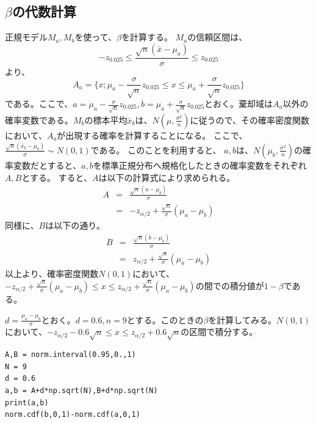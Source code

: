 \subsection{$\beta$の代数計算}
正規モデル$M_a,M_b$を使って、$\beta$を計算する。
$M_a$の信頼区間は、
\begin{equation*}
    -z_{0.025}\leq \frac{\sqrt{n}(\bar{x}-\mu_a)}{\sigma}\leq z_{0.025}
\end{equation*}
より、
\begin{equation*}
    A_a = \{ x ; \mu_a -\frac{\sigma}{\sqrt{n}}z_{0.025} \leq x \leq \mu_a +\frac{\sigma}{\sqrt{n}}z_{0.025} \}
\end{equation*}
である。ここで、$a=\mu_a -\frac{\sigma}{\sqrt{n}}z_{0.025},b = \mu_a +\frac{\sigma}{\sqrt{n}}z_{0.025} $とおく。棄却域は$A_a$以外の確率変数である。$M_b$の標本平均$\bar{x}_b$は、$N(\mu,\frac{\sigma^2}{n})$に従うので、その確率密度関数において、$A_a$が出現する確率を計算することになる。
ここで、$\frac{\sqrt{n}(\bar{x}_b-\mu_b)}{\sigma}\sim N(0,1)$である。
このことを利用すると、
$a,b$は、$N(\mu_b,\frac{\sigma^2}{n})$の確率変数だとすると、$a,b$を標準正規分布へ規格化したときの確率変数をそれぞれ$A,B$とする。
すると、$A$は以下の計算式により求められる。
\begin{eqnarray*}
    A &=& \frac{\sqrt{n}(a-\mu_b)}{\sigma} \\
    &=& -z_{\alpha/2}+\frac{\sqrt{n}}{\sigma}(\mu_a-\mu_b)
\end{eqnarray*}
同様に、$B$は以下の通り。
\begin{eqnarray*}
    B &=& \frac{\sqrt{n}(b-\mu_b)}{\sigma} \\
    &=& z_{\alpha/2}+\frac{\sqrt{n}}{\sigma}(\mu_a-\mu_b)
\end{eqnarray*}
以上より、確率密度関数$N(0,1)$において、$-z_{\alpha/2}+\frac{\sqrt{n}}{\sigma}(\mu_a-\mu_b) \leq x\leq  z_{\alpha/2}+\frac{\sqrt{n}}{\sigma}(\mu_a-\mu_b)$の間での積分値が$1-\beta$である。

$d=\frac{\mu_a-\mu_b}{\sigma}$とおく。$d=0.6,n=9$とする。このときの$\beta$を計算してみる。$N(0,1)$において、$-z_{\alpha/2} -0.6\sqrt{n} \leq x \leq z_{\alpha/2} +0.6\sqrt{n}$の区間で積分する。

\begin{lstlisting}
A,B = norm.interval(0.95,0.,1)
N = 9
d = 0.6
a,b = A+d*np.sqrt(N),B+d*np.sqrt(N)
print(a,b)
norm.cdf(b,0,1)-norm.cdf(a,0,1)
\end{lstlisting}

